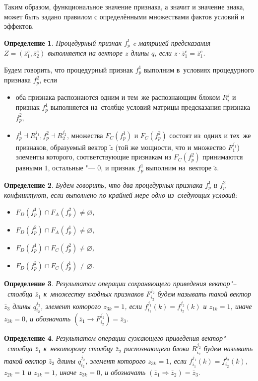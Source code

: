 \documentclass[a4paper, 12pt]{article}
\theoremstyle{plain}
\newtheorem{Def}{Определение}
\begin{document}
		Таким образом, функциональное значение признака, а значит и значение знака, может быть задано правилом с определёнными множествами фактов условий и эффектов.
		\begin{Def}
			Процедурный признак $f_p^1$ c матрицей предсказания $Z=(\bar z_1^c,\bar z_2^e)$ выполняется на векторе $z$ длины $q$, если $z\cdot \bar z_1^c=\bar z_1^c$.
		\end{Def}
		Будем говорить, что процедурный признак $f_p^1$ выполним в~условиях процедурного признака $f_p^2$, если 
		\begin{itemize}
			\item оба признака распознаются одним и тем~же распознающим блоком $R_i^j$ и признак  $f_p^1$ выполняется на~столбце условий матрицы предсказания признака $f_p^2$,
			\item $f_p^1\dashv R_1^{j_1}, f_p^2\dashv R_2^{j_2}$, множества $F_C(f_p^1 )$ и $F_C(f_p^2)$ состоят из~одних и тех~же признаков, образуемый вектор $\tilde z$ (той же мощности, что и множество $F_1^{j_1}$) элементы которого, соответствующие признакам из $F_C(f_p^2)$ принимаются равными $1$,  остальные "--- $0$, и признак $f_p^1$ выполним на~векторе $\tilde z$. 
		\end{itemize}
		
		\begin{Def}
			Будем говорить, что два процедурных признака $f_p^1$ и $f_p^2$ конфликтуют, если выполнено по крайней мере одно из~следующих условий:
			\begin{itemize}
				\item $F_D(f_p^1)\cap F_A(f_p^2)\not=\varnothing$,
				\item $F_D(f_p^2)\cap F_A(f_p^1)\not=\varnothing$,
				\item $F_D(f_p^1)\cap F_C(f_p^2)\not=\varnothing$,
				\item $F_D(f_p^2)\cap F_C(f_p^1)\not=\varnothing$.
			\end{itemize}
		\end{Def}
		
		\begin{Def}
			Результатом операции сохраняющего приведения вектор"--~столбца $\bar z_1$ к~множеству входных признаков $F_{i_2}^{j_2}$ будем называть такой вектор $\bar z_3$ длины $q_{i_2}^{j_2}$, элемент которого $z_{3k}=1$, если $f_{i_1}^{j_1}(k)=f_{i_2}^{j_2}(k)$ и $z_{1k}=1$, иначе $z_{3k}=0$, и обозначать $(\bar z_1\rightarrow F_{i_2}^{j_2})=\bar z_3$.
		\end{Def}
		
		\begin{Def}
			Результатом операции сужающего приведения вектор"--~столбца $\bar z_1$ к~некоторому столбцу $\bar z_2$ распознающего блока $R_{i_2}^{j_2}$ будем называть такой вектор $\bar z_3$ длины $q_{i_2}^{j_2}$, элемент которого $z_{3k}=1$, если $f_{i_1}^{j_1}(k)=f_{i_2}^{j_2}(k)$, $z_{2k}=1$ и $z_{1k}=1$, иначе $z_{3k}=0$, и обозначать $(\bar z_1\Rightarrow \bar z_2)=\bar z_3$.
		\end{Def}
		
\end{document}
